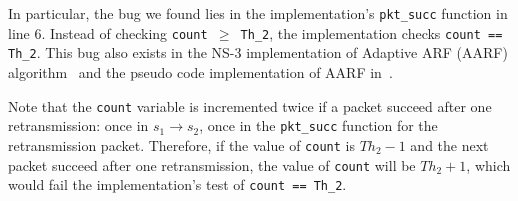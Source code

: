 In particular, the bug we found lies in the implementation's \texttt{pkt\_succ}
function in line 6. Instead of checking \texttt{count $\ge$ Th\_2}, the
implementation checks \texttt{count == Th\_2}. This bug also exists in the NS-3
implementation of Adaptive ARF (AARF) algorithm~\cite{lacage2004ieee} and the
pseudo code implementation of AARF in~\cite{lacage2004report}.

Note that the \texttt{count} variable is incremented twice if a packet succeed
after one retransmission: once in $s_1\rightarrow s_2$, once in the
\texttt{pkt\_succ} function for the retransmission packet. Therefore, if the
value of \texttt{count} is $Th_2-1$ and the next packet succeed after one
retransmission, the value of \texttt{count} will be $Th_2+1$, which would fail
the implementation's test of \texttt{count == Th\_2}.


